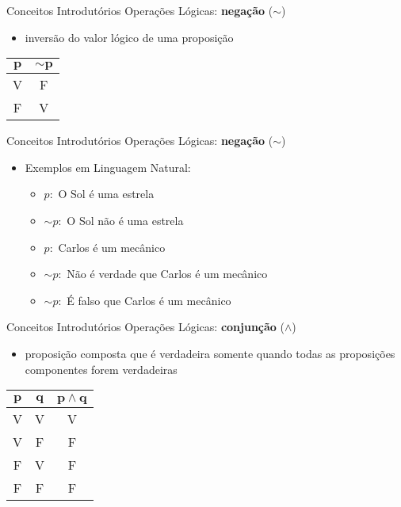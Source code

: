 \begin{frame}[t]{Conceitos Introdutórios} %
	Operações Lógicas: {\bf negação} ($\sim$)
	\begin{itemize}
	  \item inversão do valor lógico de uma proposição
	\end{itemize}

	\begin{center}	
	\begin{tabular}{|c|c|}
	\hline
	$\mathbf{p}$ & $\mathbf{\sim p}$ \\
	\hline
	V & F \\
	\hline
	F & V \\
	\hline
	\end{tabular}
	\end{center}
\end{frame}

\begin{frame}[t]{Conceitos Introdutórios} %
	Operações Lógicas: {\bf negação} ($\sim$)
	\begin{itemize}
	  \item Exemplos em Linguagem Natural:
	  \begin{itemize}
	  \item $p:$ O Sol é uma estrela
	  \item $\sim p:$ O Sol não é uma estrela
	  \item $p:$ Carlos é um mecânico
	  \item $\sim p:$ Não é verdade que Carlos é um mecânico
	  \item $\sim p:$ É falso que Carlos é um mecânico
	  \end{itemize}
	\end{itemize}
\end{frame}

\begin{frame}[t]{Conceitos Introdutórios} %
	Operações Lógicas: {\bf conjunção} ($\wedge$)
	\begin{itemize}
	  \item proposição composta que é verdadeira somente quando todas as proposições componentes forem verdadeiras
	\end{itemize}

	\begin{center}	
	\begin{tabular}{|c|c|c|}
	\hline
	$\mathbf{p}$ & $\mathbf{q}$ & $\mathbf{p \wedge q}$ \\
	\hline
	V & V & V \\
	\hline
	V & F & F \\
	\hline
	F & V & F \\
	\hline
	F & F & F \\
	\hline
	\end{tabular}
	\end{center}
\end{frame}

